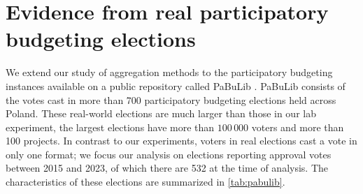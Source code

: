 \documentclass[mnsc,blindrev]{informs3_freeuse} %
\newcommand{\kibitz}[2]{\ifnum\Comments=1{\color{#1}{#2}}\fi}
\newcommand{\gb}[1]{\kibitz{red}{[GB:#1]}}
\newcommand{\points}{\textsc{Points}}
\newcommand{\knap}{\textsc{Knap}}
\newcommand{\mes}{ES}
\newcommand{\pabu}{PaBuLib}
\begin{document}




\section{Evidence from real participatory budgeting elections}\label{sec:real}

We extend our study of aggregation methods to the participatory budgeting instances available on a public repository called \pabu{} \citep{pabulib}. \pabu{} consists of the votes cast in more than 700 participatory budgeting elections held across Poland. 
These real-world elections are much larger than those in our lab experiment, the largest elections have more than $100\,000$ voters and more than 100 projects.
In contrast to our experiments, voters in real elections cast a vote in only one format; we focus our analysis on elections reporting approval votes between 2015 and 2023, of which there are  532 at the time of analysis. The characteristics of these elections are summarized in \ref{tab:pabulib}. %
\end{document}
